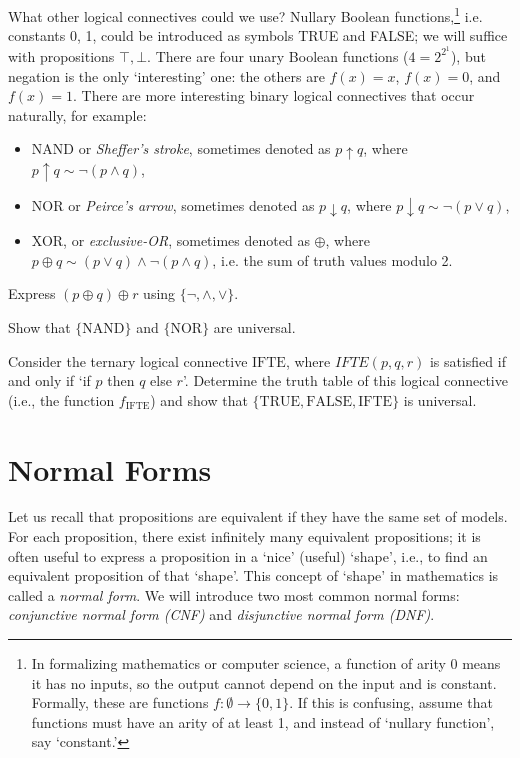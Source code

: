 What other logical connectives could we use? Nullary Boolean functions,\footnote{In formalizing mathematics or computer science, a function of arity 0 means it has no inputs, so the output cannot depend on the input and is constant. Formally, these are functions $f\colon \emptyset\to \{0,1\}$. If this is confusing, assume that functions must have an arity of at least 1, and instead of `nullary function', say `constant.'} i.e. constants 0, 1, could be introduced as symbols TRUE and FALSE; we will suffice with propositions $\top, \bot$. There are four unary Boolean functions ($4 = 2^{2^1}$), but negation is the only `interesting' one: the others are $f(x) = x$, $f(x) = 0$, and $f(x) = 1$. There are more interesting binary logical connectives that occur naturally, for example:
\begin{itemize}
    \item NAND or \emph{Sheffer's stroke}, sometimes denoted as $p \uparrow q$, where $p \uparrow q \sim \neg (p \land q)$,
    \item NOR or \emph{Peirce's arrow}, sometimes denoted as $p \downarrow q$, where $p \downarrow q \sim \neg (p \lor q)$,
    \item XOR, or \emph{exclusive-OR}, sometimes denoted as $\oplus$, where $p \oplus q \sim (p \lor q) \land \neg (p \land q)$, i.e. the sum of truth values modulo 2.
\end{itemize}

\begin{exercise}
    Express $(p \oplus q) \oplus r$ using $\{\neg, \land, \lor\}$.
\end{exercise}

\begin{exercise}
    Show that $\{\mathrm{NAND}\}$ and $\{\mathrm{NOR}\}$ are universal.
\end{exercise}

\begin{exercise}
Consider the ternary logical connective $\mathrm{IFTE}$, where $IFTE(p,q,r)$ is satisfied if and only if `if $p$ then $q$ else $r$'. Determine the truth table of this logical connective (i.e., the function $f_\mathrm{IFTE}$) and show that $\{\mathrm{TRUE}, \mathrm{FALSE}, \mathrm{IFTE}\}$ is universal.
\end{exercise}


\section{Normal Forms}

Let us recall that propositions are equivalent if they have the same set of models. For each proposition, there exist infinitely many equivalent propositions; it is often useful to express a proposition in a `nice' (useful) `shape', i.e., to find an equivalent proposition of that `shape'. This concept of `shape' in mathematics is called a \emph{normal form}. We will introduce two most common normal forms: \emph{conjunctive normal form (CNF)} and \emph{disjunctive normal form (DNF)}.

